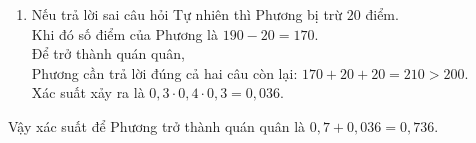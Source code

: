 \begin{ex}
{\begin{itemchoice}
\begin{enumerate}[TH1.]
			Vậy trong trường hợp này Phương chắc chắn trở thành quán quân.\\
			Xác suất xảy ra là $0{,}7$.
		\item Nếu trả lời sai câu hỏi Tự nhiên thì Phương bị trừ $20$ điểm.\\
			Khi đó số điểm của Phương là $190-20=170$.\\
			Để trở thành quán quân,\\
			Phương cần trả lời đúng cả hai câu còn lại: $170+20+20=210>200$.\\
			Xác suất xảy ra là $0{,}3\cdot 0{,}4\cdot 0{,}3	=0{,}036$.
		\end{enumerate}
			Vậy xác suất để Phương trở thành quán quân là $0{,}7+0{,}036 =0{,}736$.
	\end{itemchoice}
	}
\end{ex}

